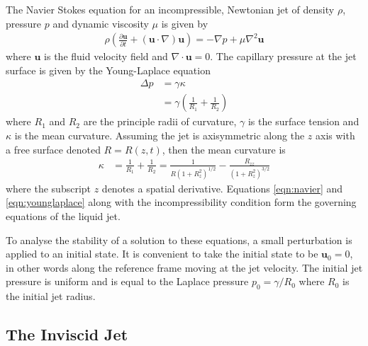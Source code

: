 \documentclass[11pt]{article}
\newcommand{\pd}[2]{\frac{\partial #1}{\partial #2}}
\begin{document}
The Navier Stokes equation for an incompressible, Newtonian jet of density $\rho$, pressure $p$ and dynamic viscosity $\mu$ is given by
\begin{align}
\rho \left( \pd{\mathbf{u}}{t} + (\mathbf{u} \cdot \nabla) \mathbf{u} \right) = - \nabla p + \mu \nabla^2 \mathbf{u}
\label{eqn:navier}
\end{align}
where $\mathbf{u}$ is the fluid velocity field and $\nabla \cdot \mathbf{u} = 0$. The capillary pressure at the jet surface is given by the Young-Laplace equation
\begin{align}
\Delta p &= \gamma \kappa \nonumber \\
&= \gamma \left(\frac{1}{R_1} + \frac{1}{R_2} \right)
\label{eqn:younglaplace}
\end{align}
where $R_1$ and $R_2$ are the principle radii of curvature, $\gamma$ is the surface tension and $\kappa$ is the mean curvature. Assuming the jet is axisymmetric along the $z$ axis with a free surface denoted  $R = R(z,t)$, then the mean curvature is
\begin{align}
\kappa &= \frac{1}{R_1} + \frac{1}{R_2} = \frac{1}{R(1+ R_z^2)^{1/2}} - \frac{R_{zz}}{(1 + R_z^2)^{3/2}}
\label{eqn:curvature}
\end{align}
where the subscript $z$ denotes a spatial derivative. Equations \ref{eqn:navier} and \ref{eqn:younglaplace} along with the incompressibility condition form the governing equations of the liquid jet.

To analyse the stability of a solution to these equations, a small perturbation is applied to an initial state. It is convenient to take the initial state to be $\mathbf{u}_0 = 0$, in other words along the reference frame moving at the jet velocity. The initial jet pressure is uniform and is equal to the Laplace pressure $p_0 = \gamma / R_0$ where $R_0$ is the initial jet radius.

\subsection{The Inviscid Jet}
\end{document}
